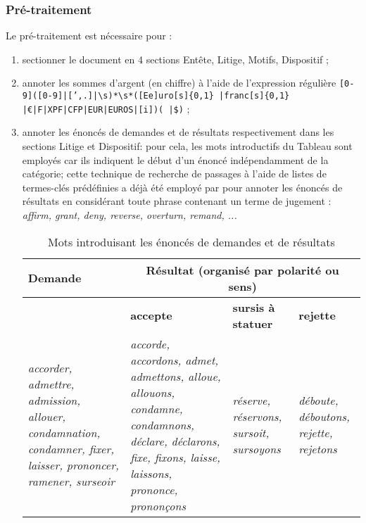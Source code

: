 \subsubsection{Pré-traitement}

Le pré-traitement est nécessaire pour :
\begin{enumerate}
	\item sectionner le document en 4 sections Entête, Litige, Motifs, Dispositif ;
	\item annoter les sommes d'argent (en chiffre) à l'aide de l'expression régulière \og \texttt{[0-9]([0-9]|[',.]|\textbackslash s)*\textbackslash s*([Ee]uro[s]\{0,1\} |franc[s]\{0,1\} \\ |\euro|F|XPF|CFP|EUR|EUROS|[i])( |\$)}\fg{} ;
	\item annoter les énoncés de demandes et de résultats respectivement dans les sections Litige et Dispositif: pour cela, les mots introductifs du Tableau  sont employés car ils indiquent le début d'un énoncé indépendamment de la catégorie; 	cette technique de recherche de passages à l'aide de listes de termes-clés prédéfinies a déjà été employé par \citet{wyner2010extractlegalelts} pour annoter les énoncés de résultats en considérant toute phrase contenant un terme de jugement : \textit{affirm, grant, deny, reverse, overturn, remand, ...}
	 
	\begin{table}[!htb]
		\centering
		\begin{tabular}{|p{}|p{}|p{}|p{}|}
			\hline
			\textbf{Demande} & \multicolumn{3}{c|}{\textbf{Résultat} (organisé par polarité ou sens)} \\ \hline
			& \textbf{accepte} &\textbf{sursis à statuer} & \textbf{rejette} \\ \hline
			\textit{accorder, admettre, admission, allouer, condamnation, condamner, fixer, laisser, prononcer, ramener, surseoir} & \textit{accorde, accordons, admet, admettons, alloue, allouons, condamne, condamnons, déclare, déclarons, fixe, fixons, laisse, laissons, prononce, prononçons} & \textit{réserve, réservons, sursoit, sursoyons} & \textit{déboute, déboutons, rejette, rejetons} \\ \hline
		\end{tabular}
		\caption{Mots introduisant les énoncés de demandes et de résultats}\label{tab:quanta:mots-introductifs}
	\end{table}

\end{enumerate} 

